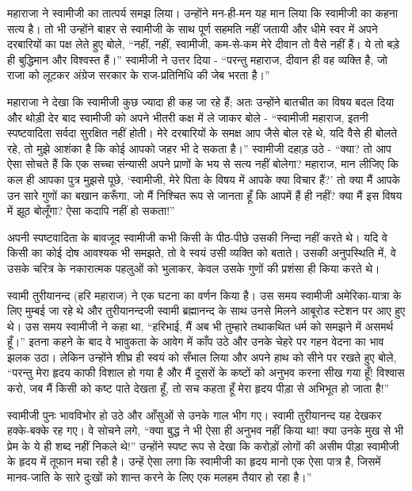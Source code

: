 महाराजा ने स्वामीजी का तात्पर्य समझ लिया। उन्होंने मन-ही-मन यह मान लिया कि स्वामीजी का कहना सत्य है। तो भी उन्होंने बाहर से स्वामीजी के साथ पूर्ण सहमति नहीं जतायी और धीमे स्वर में अपने दरबारियों का पक्ष लेते हुए बोले, “नहीं, नहीं, स्वामीजी, कम-से-कम मेरे दीवान तो वैसे नहीं हैं। ये तो बड़े ही बुद्धिमान और विश्वस्त हैं।” स्वामीजी ने उत्तर दिया - “परन्तु महाराज, दीवान ही वह व्यक्ति है, जो राजा को लूटकर अंग्रेज सरकार के राज-प्रतिनिधि की जेब भरता है।” 

महाराजा ने देखा कि स्वामीजी कुछ ज्यादा ही कह जा रहे हैं; अतः उन्होंने बातचीत का विषय बदल दिया और थोड़ी देर बाद स्वामीजी को अपने भीतरी कक्ष में ले जाकर बोले - “स्वामीजी महाराज, इतनी स्पष्टवादिता सर्वदा सुरक्षित नहीं होती। मेरे दरबारियों के समक्ष आप जैसे बोल रहे थे, यदि वैसे ही बोलते रहे, तो मुझे आशंका है कि कोई आपको जहर भी दे सकता है।” स्वामीजी दहाड़ उठे - “क्या? तो आप ऐसा सोचते हैं कि एक सच्चा संन्यासी अपने प्राणों के भय से सत्य नहीं बोलेगा? महाराज, मान लीजिए कि कल ही आपका पुत्र मुझसे पूछे, ‘स्वामीजी, मेरे पिता के विषय में आपके क्या विचार हैं?’ तो क्या मैं आपके उन सारे गुणों का बखान करूँगा, जो मैं निश्चित रूप से जानता हूँ कि आपमें हैं ही नहीं? क्या मैं इस विषय में झूठ बोलूँगा? ऐसा कदापि नहीं हो सकता!” 

अपनी स्पष्टवादिता के बावजूद स्वामीजी कभी किसी के पीठ-पीछे उसकी निन्दा नहीं करते थे। यदि वे किसी का कोई दोष आवश्यक भी समझते, तो वे स्वयं उसी व्यक्ति को बताते। उसकी अनुपस्थिति में, वे उसके चरित्र के नकारात्मक पहलुओं को भुलाकर, केवल उसके गुणों की प्रशंसा ही किया करते थे। 

\vskip -8pt

\delimiter

स्वामी तुरीयानन्द (हरि महाराज) ने एक घटना का वर्णन किया है। उस समय स्वामीजी अमेरिका-यात्रा के लिए मुम्बई जा रहे थे और तुरीयानन्दजी स्वामी ब्रह्मानन्द के साथ उनसे मिलने आबूरोड स्टेशन पर आए हुए थे। उस समय स्वामीजी ने कहा था, “हरिभाई, मैं अब भी तुम्हारे तथाकथित धर्म को समझने में असमर्थ हूँ।” इतना कहने के बाद वे भावुकता के आवेग में काँप उठे और उनके चेहरे पर गहन वेदना का भाव झलक उठा। लेकिन उन्होंने शीघ्र ही स्वयं को सँभाल लिया और अपने हाथ को सीने पर रखते हुए बोले, “परन्तु मेरा हृदय काफी विशाल हो गया है और मैं दूसरों के कष्टों को अनुभव करना सीख गया हूँ! विश्वास करो, जब मैं किसी को कष्ट पाते देखता हूँ, तो सच कहता हूँ मेरा हृदय पीड़ा से अभिभूत हो जाता है!” 

स्वामीजी पुनः भावविभोर हो उठे और आँसुओं से उनके गाल भीग गए। स्वामी तुरीयानन्द यह देखकर हक्के-बक्के रह गए। वे सोचने लगे, “क्या बुद्ध ने भी ऐसा ही अनुभव नहीं किया था! क्या उनके मुख से भी प्रेम के ये ही शब्द नहीं निकले थे!” उन्होंने स्पष्ट रूप से देखा कि करोड़ों लोगों की असीम पीड़ा स्वामीजी के हृदय में तूफान मचा रही है। उन्हें ऐसा लगा कि स्वामीजी का हृदय मानो एक ऐसा पात्र है, जिसमें मानव-जाति के सारे दुःखों को शान्त करने के लिए एक मलहम तैयार हो रहा है।” 

